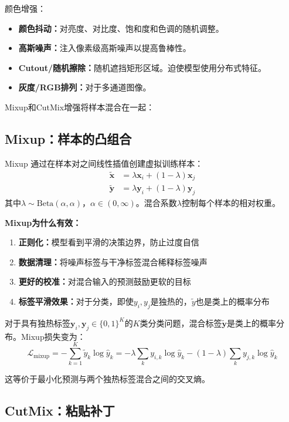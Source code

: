 颜色增强：
\begin{itemize}
    \item \textbf{颜色抖动：}对亮度、对比度、饱和度和色调的随机调整。
    \item \textbf{高斯噪声：}注入像素级高斯噪声以提高鲁棒性。
    \item \textbf{Cutout/随机擦除：}随机遮挡矩形区域。迫使模型使用分布式特征。
    \item \textbf{灰度/RGB排列：}对于多通道图像。
\end{itemize}

Mixup和CutMix增强将样本混合在一起：

\subsection{Mixup：样本的凸组合}

Mixup \cite{zhang2018mixup}通过在样本对之间线性插值创建虚拟训练样本：
\begin{align}
\tilde{\mathbf{x}} &= \lambda \mathbf{x}_i + (1 - \lambda)\mathbf{x}_j \\
\tilde{\mathbf{y}} &= \lambda \mathbf{y}_i + (1 - \lambda)\mathbf{y}_j
\end{align}
其中$\lambda \sim \text{Beta}(\alpha, \alpha)$，$\alpha \in (0, \infty)$。混合系数$\lambda$控制每个样本的相对权重。

\textbf{Mixup为什么有效：}
\begin{enumerate}
    \item \textbf{正则化：}模型看到平滑的决策边界，防止过度自信
    \item \textbf{数据清理：}将噪声标签与干净标签混合稀释标签噪声
    \item \textbf{更好的校准：}对混合输入的预测鼓励更软的目标
    \item \textbf{标签平滑效果：}对于分类，即使$y_i, y_j$是独热的，$\tilde{y}$也是类上的概率分布
\end{enumerate}

对于具有独热标签$\mathbf{y}_i, \mathbf{y}_j \in \{0,1\}^K$的$K$类分类问题，混合标签$\tilde{\mathbf{y}}$是类上的概率分布。Mixup损失变为：
\begin{equation}
\mathcal{L}_{\text{mixup}} = -\sum_{k=1}^{K} \tilde{y}_k \log \hat{y}_k = -\lambda \sum_k y_{i,k} \log \hat{y}_k - (1-\lambda) \sum_k y_{j,k} \log \hat{y}_k
\end{equation}

这等价于最小化预测与两个独热标签混合之间的交叉熵。

\subsection{CutMix：粘贴补丁}

